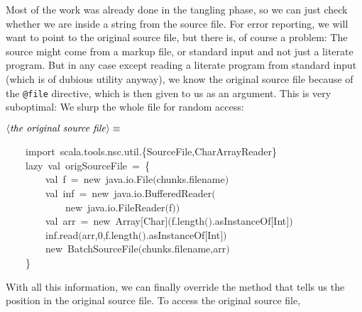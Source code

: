 \documentclass[a4paper,12pt]{article}
\begin{document}
Most of the work was already done in the tangling phase, so we can
just check whether we are inside a string from the source file. For error
reporting, we will want to point to the original source file, but there
is, of course a problem: The source might come from a markup file, or standard
input and not just a literate program. But in any case except reading a literate
program from standard input (which is of dubious utility anyway), we know the
original source file because of the \texttt{@file} directive, which is then given
to us as an argument. This is very suboptimal: We slurp the whole file
for random access:

$\left<\mbox{\emph{the original source file}}\right>\equiv$
\begin{program}~~~~{\vem import}~scala.tools.nsc.util.{\small\{}SourceFile,CharArrayReader{\small\}}
\\~~~~{\vem lazy}~{\vem val}~origSourceFile~=~{\small\{}
\\~~~~~~~~{\vem val}~f~=~{\vem new}~java.io.File$($chunks.filename$)$
\\~~~~~~~~{\vem val}~inf~=~{\vem new}~java.io.BufferedReader$($
\\~~~~~~~~~~~~{\vem new}~java.io.FileReader$($f$)$$)$
\\~~~~~~~~{\vem val}~arr~=~{\vem new}~Array$[$Char$]$$($f.length$($$)$.asInstanceOf$[$Int$]$$)$
\\~~~~~~~~inf.read$($arr,0,f.length$($$)$.asInstanceOf$[$Int$]$$)$
\\~~~~~~~~{\vem new}~BatchSourceFile$($chunks.filename,arr$)$
\\~~~~{\small\}}
\\[0.5em]\end{program}


With all this information, we can finally override the method that tells
us the position in the original source file. To access the original source
file, 
\end{document}
